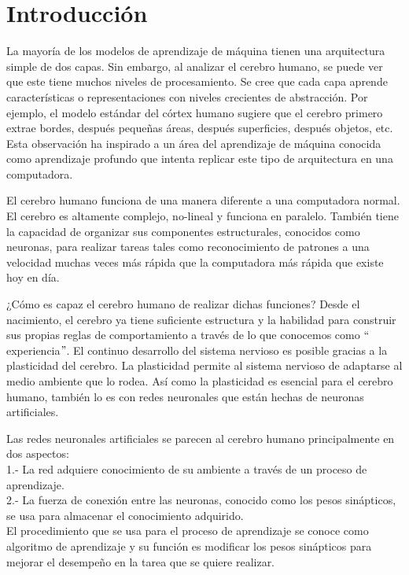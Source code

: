 \section{Introducción}
La mayoría de los modelos de aprendizaje de máquina tienen una arquitectura simple de dos capas. Sin embargo, al analizar el cerebro humano, se puede ver que este tiene muchos niveles de procesamiento. Se cree que cada capa aprende características o representaciones con niveles crecientes de abstracción. Por ejemplo, el modelo estándar del córtex humano sugiere que el cerebro primero extrae bordes, después pequeñas áreas, después superficies, después objetos, etc. Esta observación ha inspirado a un área del aprendizaje de máquina conocida como aprendizaje profundo que intenta replicar este tipo de arquitectura en una computadora.
\cite{Murphy:2012:MLP:2380985}

\vspace{1em}

El cerebro humano funciona de una manera diferente a una computadora normal. El cerebro es altamente complejo, no-lineal y funciona en paralelo. También tiene la capacidad de organizar sus componentes estructurales, conocidos como neuronas, para realizar tareas tales como reconocimiento de patrones a una velocidad muchas veces más rápida que la computadora más rápida que existe hoy en día.
\cite{Haykin:1998:NNC:521706}

\vspace{1em}

¿Cómo es capaz el cerebro humano de realizar dichas funciones? Desde el nacimiento, el cerebro ya tiene suficiente estructura y la habilidad para construir sus propias reglas de comportamiento a través de lo que conocemos como $``$experiencia$"$. El continuo desarrollo del sistema nervioso es posible gracias a la plasticidad del cerebro. La plasticidad permite al sistema nervioso de adaptarse al medio ambiente que lo rodea. Así como la plasticidad es esencial para el cerebro humano, también lo es con redes neuronales que están hechas de neuronas artificiales.
\cite{Haykin:1998:NNC:521706}

\vspace{1em}

Las redes neuronales artificiales se parecen al cerebro humano principalmente en dos aspectos: \\
1.- La red adquiere conocimiento de su ambiente a través de un proceso de aprendizaje.\\
2.- La fuerza de conexión entre las neuronas, conocido como los pesos sinápticos, se usa para almacenar el conocimiento adquirido. \\
El procedimiento que se usa para el proceso de aprendizaje se conoce como algoritmo de aprendizaje y su función es modificar los pesos sinápticos para mejorar el desempeño en la tarea que se quiere realizar. \cite{Haykin:1998:NNC:521706}

